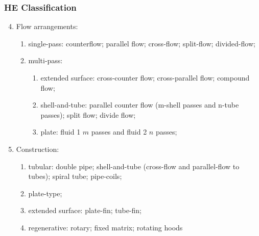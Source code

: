 \documentclass[10pt,compress,handout,ignorenonframetext,unknownkeysallowed]{beamer}
\begin{document}
\begin{frame}
 \frametitle{HE Classification}
      \begin{enumerate}\setcounter{enumi}{3}
          \item<1-> Flow arrangements:
             \begin{enumerate}
                 \item<1-> single-pass: counterflow; parallel flow; cross-flow; split-flow; divided-flow;
                 \item<2-> multi-pass: 
                    \begin{enumerate}
                       \item<2-> extended surface: cross-counter flow; cross-parallel flow; compound flow;
                       \item<2-> shell-and-tube: parallel counter flow (m-shell passes and n-tube passes); split flow; divide flow;
                       \item<2-> plate: fluid 1 $m$ passes and fluid 2 $n$ passes;
                    \end{enumerate}
             \end{enumerate}
          \item<3-> Construction:
              \begin{enumerate}
                 \item<3-> tubular: double pipe; shell-and-tube (cross-flow and parallel-flow to tubes); spiral tube; pipe-coils;
                 \item<3-> plate-type;
                 \item<3-> extended surface: plate-fin; tube-fin;
                 \item<3-> regenerative: rotary; fixed matrix; rotating hoods
              \end{enumerate}
   \end{enumerate}
\end{frame}
\end{document}
